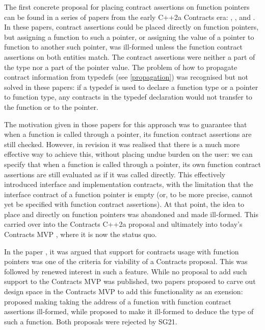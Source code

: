 The first concrete proposal for placing contract assertions on function pointers can be found in a series of papers from the early C++2a Contracts era: \cite{N4415}, \cite{P0287R0}, and \cite{P0380R0}. In these papers, contract assertions could be placed directly on function pointers, but assigning a function to such a pointer, or assigning the value of a pointer to function to another such pointer, was ill-formed unless the function contract assertions on both entities match. The contract assertions were neither a part of the type nor a part of the pointer value. The problem of how to propagate contract information from typedefs (see \ref{propagation}) was recognised but not solved in these papers:  if a typedef is used to declare a function type or a pointer to function type, any contracts in the typedef declaration would not transfer to the function or to the pointer.

The motivation given in those papers for this approach was to guarantee that when a function is called through a pointer, its function contract assertions are still checked. However, in revision \cite{P0380R1} it was realised that there is a much more effective way to achieve this, without placing undue burden on the user: we can specify that when a function is called through a pointer, its own function contract assertions are still evaluated as if it was called directly. This effectively introduced interface and implementation contracts, with the limitation that the interface contract of a function pointer is empty  (or, to be more precise, cannot yet be specified with function contract assertions). At that point, the idea to place  and  directly on function pointers was abandoned and made ill-formed. This carried over into the Contracts C++2a proposal \cite{P0542R5} and ultimately into today's Contracts MVP , where it is now the status quo.

In the paper \cite{P3173R0}, it was argued that support for contracts usage with function pointers was one of the criteria for viability of a Contracts proposal. This was followed by renewed interest in such a feature. While no proposal to add such support to the Contracts MVP was published, two papers proposed to carve out design space in the Contracts MVP to add this functionality as an exension: \cite{P3221R0} proposed making taking the address of a function with function contract assertions ill-formed, while \cite{P3250R0} proposed to make it ill-formed to deduce the type of such a function. Both proposals were rejected by SG21.

